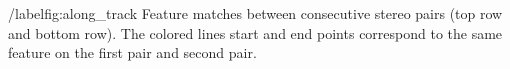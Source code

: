 /label{fig:along_track} Feature matches between consecutive stereo pairs (top row and bottom row). The colored lines start and end points correspond to the same feature on the first pair and second pair. 
  